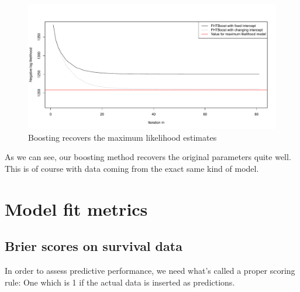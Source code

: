 \begin{figure}\label{fig:boosting-ML}
\caption{Boosting recovers the maximum likelihood estimates}
\centering\includegraphics[scale=0.4]{figures/small_example.pdf}
\end{figure}

As we can see, our boosting method recovers the original parameters quite well. This is of course with data coming from the exact same kind of model.

\section{Model fit metrics}

\subsection{Brier scores on survival data}
In order to assess predictive performance, we need what's called a proper scoring rule: One which is 1 if the actual data is inserted as predictions.

